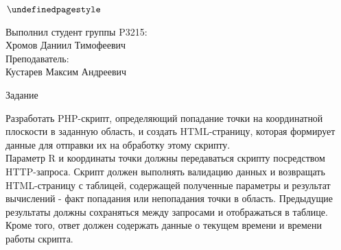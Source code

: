 \documentclass[12pt]{article}
\begin{document}
\pagestyle{fancy}
$\thispagestyle{first style}$


\vspace{25mm}


\vspace{50mm}

\begin{flushright}
Выполнил студент группы P3215:\\Хромов Даниил Тимофеевич\\
\vspace{5mm}
Преподаватель:\\Кустарев Максим Андреевич\\
\end{flushright}

\newpage

\pagestyle{empty}

\Large\textcolor{NavyBlue}{Задание}\\
\rmfamily\small
\vspace{5mm}
\raggedright
Разработать PHP-скрипт, определяющий попадание точки на координатной плоскости в заданную
область, и создать HTML-страницу, которая формирует данные для отправки их на обработку
этому скрипту.\\
\vspace{5mm}
Параметр R и координаты точки должны передаваться скрипту посредством HTTP-запроса.
Скрипт должен выполнять валидацию данных и возвращать HTML-страницу с таблицей,
содержащей полученные параметры и результат вычислений - факт попадания или непопадания
точки в область. Предыдущие результаты должны сохраняться между запросами и отображаться в
таблице.\\
\vspace{5mm}
Кроме того, ответ должен содержать данные о текущем времени и времени работы скрипта.\\
\vspace{5mm}
\end{document}
